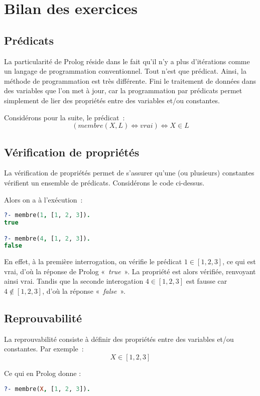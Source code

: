 \chapter{Bilan des exercices}

\section{Prédicats}

La particularité de Prolog réside dans le fait qu'il n'y a plus d'itérations comme
un langage de programmation conventionnel. Tout n'est que prédicat. Ainsi, la
méthode de programmation est très différente. Fini le traitement de données
dans des variables que l'on met à jour, car la programmation par prédicats permet
simplement de lier des propriétés entre des variables et/ou constantes.

Considérons pour la suite, le prédicat~:
\[(membre(X, L) \Leftrightarrow vrai) \Leftrightarrow X \in L\]


\section{Vérification de propriétés}

La vérification de propriétés permet de s'assurer qu'une (ou plusieurs) constantes
vérifient un ensemble de prédicats. Considérons le code ci-dessus.

Alors on a à l'exécution~:

\begin{lstlisting}[language=Prolog,frame=single]
?- membre(1, [1, 2, 3]).
true

?- membre(4, [1, 2, 3]).
false
\end{lstlisting}

En effet, à la première interrogation, on vérifie le prédicat $1 \in [1, 2, 3]$,
ce qui est vrai, d'où la réponse de Prolog «~\textit{true}~». La propriété est alors vérifiée, 
renvoyant ainsi vrai. Tandis que la seconde interogation $4 \in [1, 2, 3]$ est fausse car 
$4 \notin [1, 2, 3]$, d'où la réponse «~\textit{false}~».


\section{Reprouvabilité}

La reprouvabilité consiste à définir des propriétés entre des
variables et/ou constantes. Par exemple~:
\[
	X \in [1, 2, 3]
\]

 Ce qui en Prolog donne :
\begin{lstlisting}[language=Prolog]
?- membre(X, [1, 2, 3]).
\end{lstlisting}

